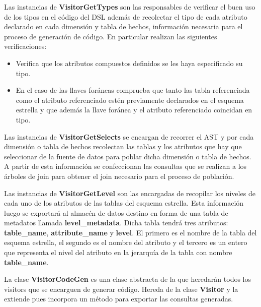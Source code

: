 Las instancias de \textbf{VisitorGetTypes} son las responsables de verificar el buen uso de los tipos en el 
código del DSL además de recolectar el tipo de cada atributo declarado en cada dimensión y 
tabla de hechos, 
información necesaria para el proceso de generación de código. En particular realizan 
las siguientes verificaciones: 

\begin{itemize}
    \item Verifica que los atributos compuestos definidos se les haya especificado su tipo.
    \item En el caso de las llaves for\'aneas comprueba que tanto las tabla referenciada como el atributo 
        referenciado est\'en previamente declarados en el esquema estrella y que además la llave for\'anea 
        y el atributo referenciado coincidan en tipo.
\end{itemize}

Las instancias de \textbf{VisitorGetSelects} se encargan de recorrer el AST y por cada dimensión o tabla 
de hechos recolectan las tablas y los atributos que hay que seleccionar de la fuente de datos 
para poblar dicha dimensión o tabla de hechos. A partir de esta información se confeccionan las consultas 
que se realizan a los \'arboles de join para obtener el join necesario para el proceso de población.

Las instancias de \textbf{VisitorGetLevel} son las encargadas de recopilar los niveles de cada uno de los 
atributos de las tablas del esquema estrella. Esta información luego se exportar\'a al almacén de datos 
destino en forma de una tabla de metadatos llamada \textbf{level\_metadata}. Dicha tabla tendrá tres atributos: 
\textbf{table\_name}, \textbf{attribute\_name} y \textbf{level}. El primero es el nombre de la tabla del esquema 
estrella, el segundo es el nombre del atributo y el tercero es un entero que representa el nivel del atributo 
en la jerarquía de la tabla con nombre \textbf{table\_name}.

La clase \textbf{VisitorCodeGen} es una clase abstracta de la que heredar\'an todos los visitors que 
se encarguen de generar código. Hereda de la clase \textbf{Visitor} y la extiende pues incorpora un 
método para exportar las consultas generadas.

